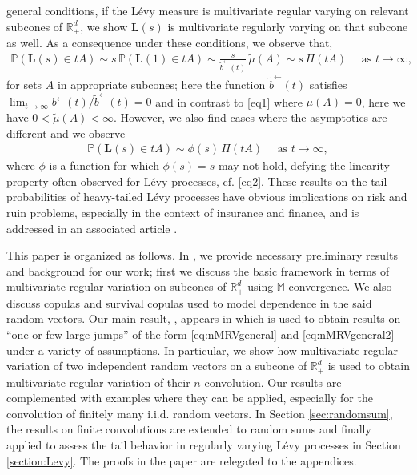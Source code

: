 \documentclass[aos]{imsart}
\numberwithin{equation}{section}
\theoremstyle{plain} %
\theoremstyle{remark}
\newcommand{\M}{\mathbb{M}}
\renewcommand\P{\mathbb{P}}
\newcommand{\R}{\mathbb{R}}
\def\bL{\boldsymbol L}
\begin{document}
general conditions, if the L\'evy measure is multivariate regular varying on relevant subcones of $\R_+^d$, we
show  $\bL(s)$ is multivariate regularly varying on that subcone as well.
As a consequence under these conditions, we observe that,
\begin{eqnarray} \label{eq2}
    \P(\bL(s)\in tA)  \sim s\,\P(\bL(1)\in tA) \sim  \frac{s}{\widetilde b^{\leftarrow}(t)}\,\widetilde \mu(A)\sim  s\,\Pi(tA)  \quad \text{ as } t\to\infty,
\end{eqnarray}
for  sets $A$ in appropriate subcones; here the function $\widetilde{b}^{\leftarrow}(t)$ satisfies $\lim_{t\to\infty}
 b^{\leftarrow}(t)/\widetilde b^{\leftarrow}(t)=0$ and in contrast to \eqref{eq1} where $\mu(A)=0$, here we have $0<\widetilde{\mu}(A)<\infty$. However,  we also find cases where the asymptotics are different and we observe
 \begin{eqnarray} \label{eq3}
    \P(\bL(s)\in tA) \sim \phi(s)\,\Pi(tA) \quad \text{ as } t\to\infty,
\end{eqnarray}
where $\phi$ is a function for which $\phi(s)=s$ may not hold, defying the linearity property often observed for L\'evy processes, cf. \eqref{eq2}.
These results on the tail probabilities of heavy-tailed L\'evy processes have obvious implications on risk and ruin problems, especially in the context of insurance and finance, and is addressed in an associated article \cite{das:fasen:2023}.



This paper is organized as follows. In , we provide necessary preliminary results and background for our work; first we discuss the basic framework in terms of multivariate regular variation on subcones of $\R_+^d$ using $\M$-convergence.  We also discuss copulas and survival copulas used to model dependence in the said random vectors.
Our main result, , appears in  which is used to obtain results on ``{one or few large jumps}'' of the form \eqref{eq:nMRVgeneral} and \eqref{eq:nMRVgeneral2} under a variety of assumptions. In particular, we show
how  multivariate regular variation  of two independent random vectors on a subcone of $\R_+^d$ is used to obtain multivariate regular variation of their $n$-convolution. Our results are complemented with examples where they can be applied, especially for the convolution of finitely many i.i.d. random vectors. In Section \ref{sec:randomsum}, the results on finite convolutions are extended to random sums and finally applied to assess the tail behavior in regularly varying L\'evy processes in Section \ref{section:Levy}. The  proofs in the paper are relegated to the appendices.
\end{document}
